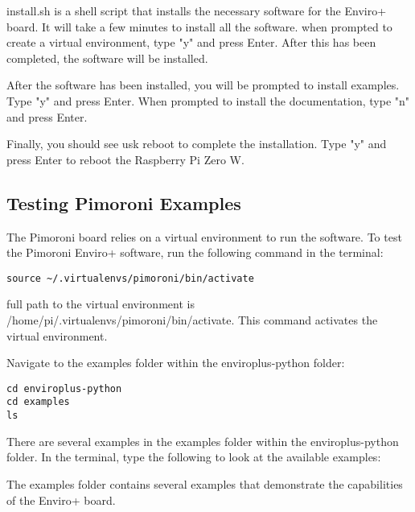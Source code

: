 \documentclass{article}
\begin{document}
install.sh is a shell script that installs the necessary software for the Enviro+ board. It will take a few minutes to install all the software. when prompted to create a virtual environment, type "y" and press Enter. After this has been completed, the software will be installed. 

After the software has been installed, you will be prompted to install examples. Type "y" and press Enter.
When prompted to install the documentation, type "n" and press Enter. 

Finally, you should see usk reboot to complete the installation. Type "y" and press Enter to reboot the Raspberry Pi Zero W.

\subsection{Testing Pimoroni Examples}

The Pimoroni board relies on a virtual environment to run the software. To test the Pimoroni Enviro+ software, run the following command in the terminal:

\begin{verbatim}
source ~/.virtualenvs/pimoroni/bin/activate
\end{verbatim}

full path to the virtual environment is /home/pi/.virtualenvs/pimoroni/bin/activate. This command activates the virtual environment.

Navigate to the examples folder within the enviroplus-python folder:

\begin{verbatim}
cd enviroplus-python
cd examples
ls
\end{verbatim}

There are several examples in the examples folder within the enviroplus-python folder. In the terminal, type the following to look at the available examples:

The examples folder contains several examples that demonstrate the capabilities of the Enviro+ board.
\end{document}
